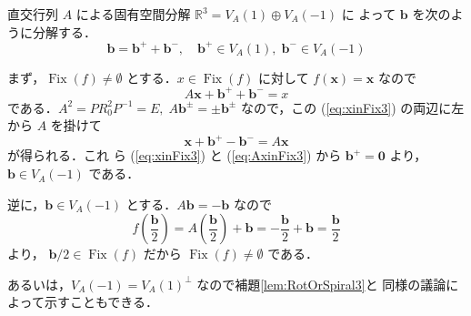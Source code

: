 \documentclass[11pt, uplatex, dvipdfmx, titlepage]{jsarticle}
\makeatletter
\DeclareMathOperator{\Fix}{Fix}
\renewenvironment{proof}[1][\proofname]{\par
  \pushQED{\qed}%
  \normalfont \topsep6\p@\@plus6\p@\relax
  \trivlist
  \item[\hskip\labelsep
         \bfseries
    {#1}]\ignorespaces
}{%
  \popQED\endtrivlist\@endpefalse
}
\theoremstyle{definition}
\renewcommand{\proofname}{\textbf{証明}}
\makeatother
\begin{document}
\begin{proof}
  直交行列 $A$ による固有空間分解 $\mathbb{R}^3 = V_A(1) \oplus V_A(-1)$ に
  よって $\bm{b}$ を次のように分解する．
\[
  \bm{b} = \bm{b}^{+} + \bm{b}^{-}, \quad \bm{b}^{+}   \in V_A(1), \; \bm{b}^{-}  \in V_A(-1)
\]

まず，$\Fix(f) \neq \emptyset$ とする．$x \in \Fix(f)$
に対して $f(\bm{x}) = \bm{x}$ なので
\begin{equation}\label{eq:xinFix3}
  A \bm{x} + \bm{b}^{+} + \bm{b}^{-} = x
\end{equation}
である．$A^2=PR_0^2P^{-1} = E, \; A\bm{b}^{\pm} = \pm
\bm{b}^{\pm}$ なので，この (\ref{eq:xinFix3}) の両辺に左から $A$ を掛けて
\begin{equation}\label{eq:AxinFix3}
  \bm{x}  + \bm{b}^{+} - \bm{b}^{-} = A\bm{x}
\end{equation}
が得られる．これ
ら (\ref{eq:xinFix3}) と (\ref{eq:AxinFix3}) から $\bm{b}^{+}=\bm{0}$
より， $\bm{b} \in V_A(-1)$ である．

逆に，$\bm{b} \in V_A(-1)$ とする．$A\bm{b} = -\bm{b}$ なので
\[
  f\left(\frac{\bm{b}}{2}\right) = A\left(\frac{\bm{b}}{2}\right)
  +\bm{b} = -\frac{\bm{b}}{2} + \bm{b} = \frac{\bm{b}}{2}
\]
より， $\bm{b}/2 \in \Fix(f)$ だから $\Fix(f) \neq \emptyset$ である．


あるいは，$V_A(-1)= V_A(1)^{\perp}$ なので補題\ref{lem:RotOrSpiral3}と
同様の議論によって示すこともできる．
\end{proof}
\end{document}
